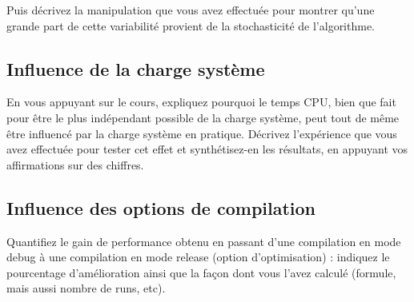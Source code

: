 Puis décrivez la manipulation que vous avez effectuée pour montrer qu'une grande part de cette variabilité provient de la stochasticité de l'algorithme. 


\subsection{Influence de la charge système}
En vous appuyant sur le cours, expliquez pourquoi le temps CPU, bien que fait pour être le plus indépendant possible de la charge système, peut tout de même être influencé par la charge système en pratique. Décrivez l'expérience que vous avez effectuée pour tester cet effet et synthétisez-en les résultats, en appuyant vos affirmations sur des chiffres. 

\subsection{Influence des options de compilation}
Quantifiez le gain de performance obtenu en passant d'une compilation en mode debug à une compilation en mode release (option d'optimisation) : indiquez le pourcentage d'amélioration ainsi que la façon dont vous l'avez calculé (formule, mais aussi nombre de runs, etc).
